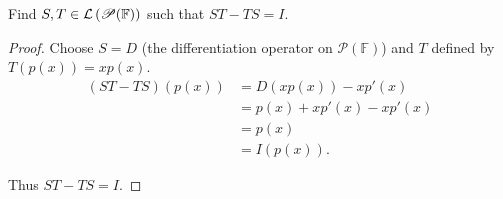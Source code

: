 \begin{exercise}\label{chapter8:sectionD:exercise13}
    Find $S, T\in\mathcal{L}\left({\mathscr{P}(\mathbb{F})}\right)$ such that $ST - TS = I$.
\end{exercise}

\begin{proof}
    Choose $S = D$ (the differentiation operator on $\mathscr{P}(\mathbb{F})$) and $T$ defined by $T(p(x)) = xp(x)$.
    \begin{align*}
        (ST - TS)(p(x)) & = D(xp(x)) - xp'(x)      \\
                        & = p(x) + xp'(x) - xp'(x) \\
                        & = p(x)                   \\
                        & = I(p(x)).
    \end{align*}

    Thus $ST - TS = I$.
\end{proof}
\newpage
